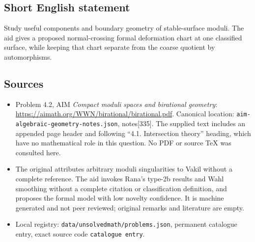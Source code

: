 \documentclass[11pt]{article}
\begin{document}
\subsection{Short English statement}
Study useful components and boundary geometry of stable-surface moduli. The aid gives a proposed normal-crossing formal deformation chart at one classified surface, while keeping that chart separate from the coarse quotient by automorphisms.
\subsection{Sources}
\begin{itemize}
\item Problem 4.2, AIM \emph{Compact moduli spaces and birational geometry}: \url{https://aimath.org/WWN/birational/birational.pdf}. Canonical location: \texttt{aim-algebraic-geometry-notes.json}, notes[335]. The supplied text includes an appended page header and following ``4.1. Intersection theory'' heading, which have no mathematical role in this question. No PDF or source TeX was consulted here.
\item The original attributes arbitrary moduli singularities to Vakil without a complete reference. The aid invokes Rana's type-2b results and Wahl smoothing without a complete citation or classification definition, and proposes the formal model with low novelty confidence. It is machine generated and not peer reviewed; original remarks and literature are empty.
\item Local registry: \texttt{data/unsolvedmath/problems.json}, permanent catalogue entry, exact source code \texttt{catalogue entry}.
\end{itemize}
\end{document}
